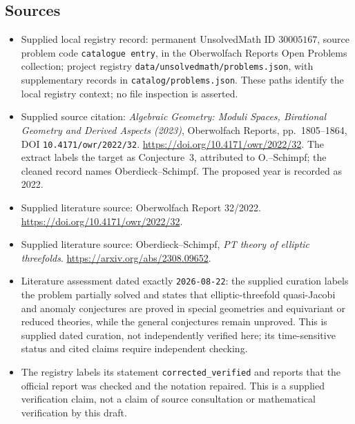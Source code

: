 \documentclass[11pt]{article}
\begin{document}
\subsection{Sources}
\begin{itemize}
\item Supplied local registry record: permanent UnsolvedMath ID \(30005167\), source problem code \texttt{catalogue entry}, in the Oberwolfach Reports Open Problems collection; project registry \texttt{data/unsolvedmath/problems.json}, with supplementary records in \texttt{catalog/problems.json}. These paths identify the local registry context; no file inspection is asserted.
\item Supplied source citation: \emph{Algebraic Geometry: Moduli Spaces, Birational Geometry and Derived Aspects (2023)}, Oberwolfach Reports, pp.~1805--1864, DOI \texttt{10.4171/owr/2022/32}. \url{https://doi.org/10.4171/owr/2022/32}. The extract labels the target as Conjecture~3, attributed to O.--Schimpf; the cleaned record names Oberdieck--Schimpf. The proposed year is recorded as 2022.
\item Supplied literature source: Oberwolfach Report 32/2022. \url{https://doi.org/10.4171/owr/2022/32}.
\item Supplied literature source: Oberdieck--Schimpf, \emph{PT theory of elliptic threefolds}. \url{https://arxiv.org/abs/2308.09652}.
\item Literature assessment dated exactly \texttt{2026-08-22}: the supplied curation labels the problem partially solved and states that elliptic-threefold quasi-Jacobi and anomaly conjectures are proved in special geometries and equivariant or reduced theories, while the general conjectures remain unproved. This is supplied dated curation, not independently verified here; its time-sensitive status and cited claims require independent checking.
\item The registry labels its statement \texttt{corrected\_verified} and reports that the official report was checked and the notation repaired. This is a supplied verification claim, not a claim of source consultation or mathematical verification by this draft.
\end{itemize}
\end{document}
